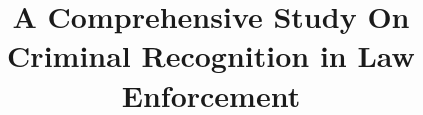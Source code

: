 \documentclass[conference]{IEEEtran}
\begin{document}

	\title{A Comprehensive Study On Criminal Recognition in Law Enforcement}

	

	\maketitle

	
	
	
	
	
	
	

	
\end{document}
